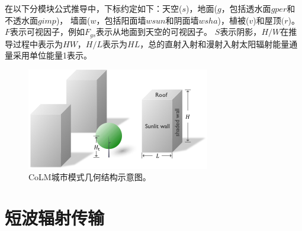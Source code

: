 在以下分模块公式推导中，下标约定如下：天空($s$)，地面($g$，包括透水面$gper$和不透水面$gimp$)，
墙面($w$，包括阳面墙$wsun$和阴面墙$wsha$)，植被($v$)和屋顶$(r$)。$F$表示可视因子，例如$F_{gs}$表示从地面到天空的可视因子。
$S$表示阴影，$H/W$在推导过程中表示为$HW$，$H/L$表示为$HL$，总的直射入射和漫射入射太阳辐射能量通量采用单位能量1表示。

{
\begin{figure}[]
\centering
\includegraphics{Figures/城市模式/CoLM城市模式几何结构示意图.png}
\caption{CoLM城市模式几何结构示意图。}
\label{fig:CoLM城市模式几何结构示意图}
\end{figure}
}
\section{短波辐射传输}\label{短波辐射传输}
